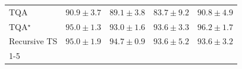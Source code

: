 \begin{tabular}{l|cccc|}
TQA & {\cellcolor[HTML]{348EBF}} \color[HTML]{F1F1F1} $90.9\pm 3.7$ & {\cellcolor[HTML]{60A1CA}} \color[HTML]{F1F1F1} $89.1\pm 3.8$ & {\cellcolor[HTML]{C6CCE3}} \color[HTML]{000000} $83.7\pm 9.2$ & {\cellcolor[HTML]{3790C0}} \color[HTML]{F1F1F1} $90.8\pm 4.9$ \\
TQA$^\star$ & {\cellcolor[HTML]{046299}} \color[HTML]{F1F1F1} $95.0\pm 1.3$ & {\cellcolor[HTML]{0C74B2}} \color[HTML]{F1F1F1} $93.0\pm 1.6$ & {\cellcolor[HTML]{056EAD}} \color[HTML]{F1F1F1} $93.6\pm 3.3$ & {\cellcolor[HTML]{045687}} \color[HTML]{F1F1F1} $96.2\pm 1.7$ \\
Recursive TS & {\cellcolor[HTML]{046299}} \color[HTML]{F1F1F1} $95.0\pm 1.9$ & {\cellcolor[HTML]{04649E}} \color[HTML]{F1F1F1} $94.7\pm 0.9$ & {\cellcolor[HTML]{056EAD}} \color[HTML]{F1F1F1} $93.6\pm 5.2$ & {\cellcolor[HTML]{056EAD}} \color[HTML]{F1F1F1} $93.6\pm 3.2$ \\
\cline{1-5}
\bottomrule
\end{tabular}
